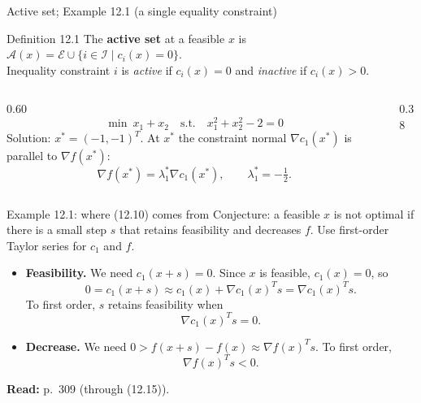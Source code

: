 \documentclass[aspectratio=169,12pt]{beamer}
\newcommand{\xs}{x^{*}}
\newcommand{\gradf}{\nabla f}
\newcommand{\readbook}[1]{{\color{red}\textbf{Read:} #1}}
\newcommand{\ls}{\lambda^{*}}
\newcommand{\cA}{\mathcal{A}}
\newcommand{\cE}{\mathcal{E}}
\newcommand{\cI}{\mathcal{I}}
\begin{document}
\begin{frame}{Active set; Example 12.1 (a single equality constraint)}
  \begin{block}{Definition 12.1}
    The \textbf{active set} at a feasible $x$ is
    $\cA(x)=\cE\cup\{i\in\cI\mid c_{i}(x)=0\}$.\\
    Inequality constraint $i$ is \emph{active} if $c_{i}(x)=0$ and \emph{inactive} if $c_{i}(x)>0$.
  \end{block}
  \begin{columns}[T,totalwidth=\textwidth]
    \begin{column}{0.60\textwidth}
      \[ \min\ x_{1}+x_{2}\quad\text{s.t.}\quad x_{1}^{2}+x_{2}^{2}-2=0 \tag{12.9} \]
      Solution: $\xs=(-1,-1)^{T}$.
      At $\xs$ the constraint normal $\nabla c_{1}(\xs)$ is parallel to $\gradf(\xs)$:
      \[ \gradf(\xs)=\ls_{1}\nabla c_{1}(\xs),\qquad \ls_{1}=-\tfrac12 . \tag{12.10} \]
    \end{column}
    \begin{column}{0.38\textwidth}
      \centering
    \end{column}
  \end{columns}
\end{frame}

\begin{frame}{Example 12.1: where (12.10) comes from}
  Conjecture: a feasible $x$ is not optimal if there is a small step $s$ that retains feasibility and
  decreases $f$. Use first-order Taylor series for $c_{1}$ and $f$.
  \begin{itemize}\setlength\itemsep{0.6em}
    \item \textbf{Feasibility.} We need $c_{1}(x+s)=0$. Since $x$ is feasible, $c_{1}(x)=0$, so
      \[ 0=c_{1}(x+s)\approx c_{1}(x)+\nabla c_{1}(x)^{T}s=\nabla c_{1}(x)^{T}s . \tag{12.11} \]
      To first order, $s$ retains feasibility when
      \[ \nabla c_{1}(x)^{T}s=0 . \tag{12.12} \]
    \item \textbf{Decrease.} We need $0>f(x+s)-f(x)\approx\gradf(x)^{T}s$. To first order,
      \[ \gradf(x)^{T}s<0 . \tag{12.13} \]
  \end{itemize}
  \readbook{p.~309 (through (12.15)).}
\end{frame}
\end{document}
